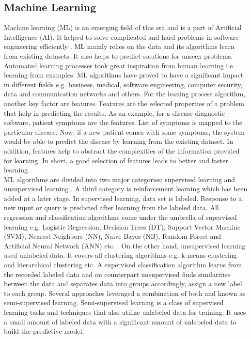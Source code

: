 \subsection {Machine Learning}
Machine learning (ML) is an emerging field of this era
and is a part of Artificial Intelligence (AI). It helped to solve complicated and hard problems in
software engineering efficiently \cite{Zhang2003}. ML mainly relies on the data and its algorithms learn
from existing datasets. It also helps to predict solutions for unseen problems. Automated learning
processes took great inspiration from human learning i.e. learning from examples. ML algorithms
have proved to have a significant impact in different fields e.g. business, medical, software
engineering, computer security, data and communication networks and others. For the leaning
process algorithm, another key factor are features. Features are the selected properties of a
problem that help in predicting the results. As an example, for a disease diagnostic software,
patient symptoms are the features.  List of symptoms is mapped to the particular disease. Now, if a new patient comes with some symptoms, the system would be able
to predict the disease by learning from the existing dataset. In addition, features help to abstract the complexities of the information
provided for learning. In short, a good selection of features leads to better and faster
learning.\\

	ML algorithms are divided into two major categories; supervised learning and unsupervised
learning \cite{Davis:1993} \cite{kotsiantis2007}. A third category is reinforcement learning which has been added at a
later stage. In supervised learning, data set is labeled. Response to a new input or query
is predicted after learning from the labeled data. All regression and classification
algorithms come under the umbrella of supervised learning e.g. Logistic Regression, Decision
Trees (DT), Support Vector Machine (SVM), Nearest Neighbors (NN), Naive Bayes (NB), Random
Forest and Artificial Neural Network (ANN) etc. \cite{lison2015introduction}. On the other hand, unsupervised learning used unlabeled data. It covers all clustering algorithms e.g. k-means clustering and
hierarchical clustering etc. A supervised classification algorithm learns from the recorded labeled data and on counterpart unsupervised finds similarities between the data and separates data into groups accordingly, assign a new label to each group. Several approaches leveraged a combination of both and known as semi-supervised learning. Semi-supervised learning is a class of supervised learning tasks and techniques that also utilize unlabeled data for training. It uses a small amount of labeled data with a significant amount of unlabeled data to build the predictive model.\cite{SemiSupervisedLearning}
